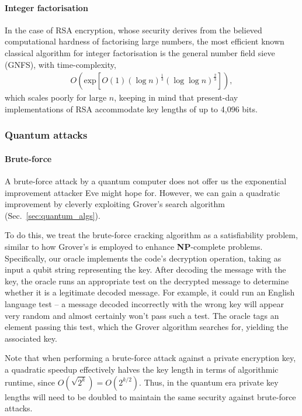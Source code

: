 \paragraph{Integer factorisation}

In the case of RSA encryption, whose security derives from the believed computational hardness of factorising large numbers, the most efficient known classical algorithm for integer factorisation is the general number field sieve (GNFS), with time-complexity,
\begin{align}
	O(\mathrm{exp}[O(1) (\log n)^{\frac{1}{3}} (\log\log n)^{\frac{2}{3}}]),
\end{align}
which scales poorly for large $n$, keeping in mind that present-day implementations of RSA accommodate key lengths of up to 4,096 bits. 

\subsubsection{Quantum attacks}

\paragraph{Brute-force}

A brute-force attack by a quantum computer does not offer us the exponential improvement attacker Eve might hope for. However, we can gain a quadratic improvement by cleverly exploiting Grover's search algorithm (Sec.~\ref{sec:quantum_algs}).

To do this, we treat the brute-force cracking algorithm as a satisfiability problem, similar to how Grover's is employed to enhance \textbf{NP}-complete problems. Specifically, our oracle implements the code's decryption operation, taking as input a qubit string representing the key. After decoding the message with the key, the oracle runs an appropriate test on the decrypted message to determine whether it is a legitimate decoded message. For example, it could run an English language test -- a message decoded incorrectly with the wrong key will appear very random and almost certainly won't pass such a test. The oracle tags an element passing this test, which the Grover algorithm searches for, yielding the associated key.

Note that when performing a brute-force attack against a private encryption key, a quadratic speedup effectively halves the key length in terms of algorithmic runtime, since \mbox{$O(\sqrt{2^k}) = O(2^{k/2})$}. Thus, in the quantum era private key lengths will need to be doubled to maintain the same security against brute-force attacks.

